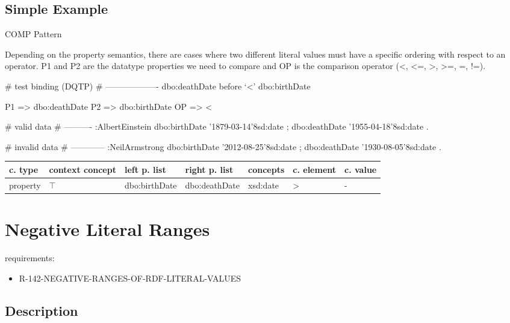 \documentclass{llncs}
\newenvironment{gcotable}{
  \scriptsize
  \sffamily
  \vspace{0.3cm}
  \begin{tabular}{l|l|l|l|l|l|l}
  \hline
  \textbf{c. type} & \textbf{context concept} & \textbf{left p. list} & \textbf{right p. list} & \textbf{concepts} & \textbf{c. element} & \textbf{c. value} \\
  \hline

}{
  \hline
  \end{tabular}
  \linebreak
}
\begin{document}
\subsection{Simple Example}


COMP Pattern \cite{Kontokostas2014} 

Depending on the property semantics,
there are cases where two different literal values must have
a specific ordering with respect to an operator. 
P1 and P2 are the datatype properties we need to compare and 
OP is the comparison operator (\textless, \textless=, \textgreater, \textgreater=, =, !=). 

\begin{ex}
# test binding (DQTP)
# -------------------
dbo:deathDate before ‘<’ dbo:birthDate

P1 => dbo:deathDate
P2 => dbo:birthDate
OP => <
\end{ex}

\begin{ex}
# valid data
# ----------
:AlbertEinstein
    dbo:birthDate '1879-03-14'^^xsd:date ;
    dbo:deathDate '1955-04-18'^^xsd:date .
\end{ex}

\begin{ex}
# invalid data
# ------------
:NeilArmstrong
    dbo:birthDate '2012-08-25'^^xsd:date ;
    dbo:deathDate '1930-08-05'^^xsd:date .
\end{ex}

\begin{gcotable}
property & $\top$ & dbo:birthDate & dbo:deathDate & xsd:date & \textgreater & - \\
\end{gcotable}

\section{Negative Literal Ranges}

requirements:

\begin{itemize}
	\item R-142-NEGATIVE-RANGES-OF-RDF-LITERAL-VALUES
\end{itemize}

\subsection{Description}
\end{document}
